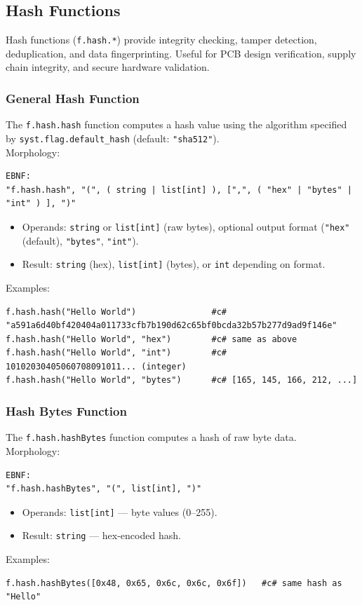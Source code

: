 \subsection{Hash Functions}

Hash functions (\texttt{f.hash.*}) provide integrity checking, tamper detection, deduplication, and data fingerprinting. Useful for PCB design verification, supply chain integrity, and secure hardware validation.

\subsubsection{General Hash Function}
The \texttt{f.hash.hash} function computes a hash value using the algorithm specified by \texttt{syst.flag.default\_hash} (default: \texttt{"sha512"}). \\
Morphology:
\begin{verbatim}
EBNF:
"f.hash.hash", "(", ( string | list[int] ), [",", ( "hex" | "bytes" | "int" ) ], ")"
\end{verbatim}
\begin{itemize}
\item Operands: \texttt{string} or \texttt{list[int]} (raw bytes), optional output format (\texttt{"hex"} (default), \texttt{"bytes"}, \texttt{"int"}).
\item Result: \texttt{string} (hex), \texttt{list[int]} (bytes), or \texttt{int} depending on format.
\end{itemize}
Examples:
\begin{verbatim}
f.hash.hash("Hello World")               #c# "a591a6d40bf420404a011733cfb7b190d62c65bf0bcda32b57b277d9ad9f146e"
f.hash.hash("Hello World", "hex")        #c# same as above
f.hash.hash("Hello World", "int")        #c# 10102030405060708091011... (integer)
f.hash.hash("Hello World", "bytes")      #c# [165, 145, 166, 212, ...]
\end{verbatim}

\subsubsection{Hash Bytes Function}
The \texttt{f.hash.hashBytes} function computes a hash of raw byte data. \\
Morphology:
\begin{verbatim}
EBNF:
"f.hash.hashBytes", "(", list[int], ")"
\end{verbatim}
\begin{itemize}
\item Operands: \texttt{list[int]} --- byte values (0--255).
\item Result: \texttt{string} --- hex-encoded hash.
\end{itemize}
Examples:
\begin{verbatim}
f.hash.hashBytes([0x48, 0x65, 0x6c, 0x6c, 0x6f])   #c# same hash as "Hello"
\end{verbatim}

